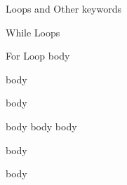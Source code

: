 \documentclass{article}
\begin{document}
\begin{algorithm}[H]
    \caption{Loops and Other keywords}
    \begin{algorithmic}[1]
        \State While Loops
        \State {}
        \EndWhile

        \State For Loop
        \State body
        \EndFor

        \State

        \State body
        \EndFor

        \State

        \Loop
        \State body
        \EndLoop

        \State

        \State body
        \State body
        \Else
        \State body
        \EndIf


        \State

        \State body
        \EndProcedure

        \State

        \State body
        \EndFunction

    \end{algorithmic}
\end{algorithm}





\end{document}
